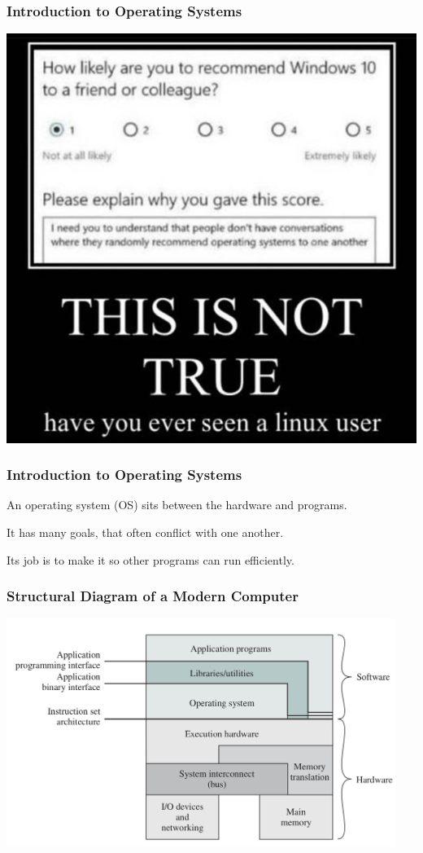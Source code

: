 \begin{frame}
\frametitle{Introduction to Operating Systems}

\begin{center}
	\includegraphics[width=.6\textwidth]{images/linux-user.jpg}
\end{center}


\end{frame}


\begin{frame}
\frametitle{Introduction to Operating Systems}

An operating system (OS) sits between the hardware and programs.

It has many goals, that often conflict with one another.

Its job is to make it so other programs can run efficiently.

\end{frame}

\begin{frame}
\frametitle{Structural Diagram of a Modern Computer}

\begin{center}
\includegraphics[width=0.95\textwidth]{images/os-sw-hw.png}
\end{center}

\end{frame}


